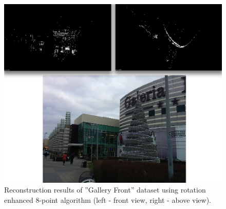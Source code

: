\begin{figure}[p]
    \centering
    \includegraphics[width=\linewidth]{GallerFrontReconstruction}
    \caption[Reconstruction results of ''Gallery Front'' dataset]{Reconstruction results of ''Gallery Front'' dataset using rotation enhanced 8-point algorithm (left - front view, right - above view).}
\end{figure}





 






